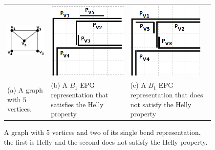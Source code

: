 \begin{figure}[h]
  \centering
  \begin{tabular}{ p{4cm} p{5cm} p{5cm} }
    \centering \includegraphics[width=3cm]{./img/envelope.png} & \includegraphics[width=4cm]{./img/envelopeHellyGradeTransparente.png} & \includegraphics[width=3.8cm]{./img/envelopeNaoHellyGrade.png}
    \\
    \footnotesize \centering (a) A graph with  5 vertices. & \footnotesize(b) A $B_1$-EPG representation that satisfies the Helly property & \footnotesize (c) A $B_1$-EPG representation that does not satisfy the Helly property  \\

  \end{tabular}
\caption{A graph with 5 vertices and two of its single bend representation, the first is Helly and the second does not satisfy the Helly property.} \label{fig:envelopeRepresentacoes}
\end{figure}